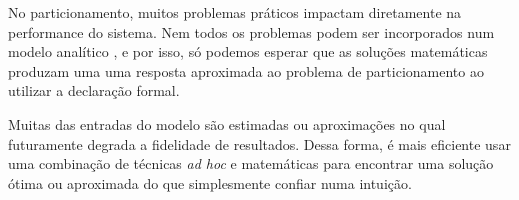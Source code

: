          No particionamento, muitos problemas práticos impactam diretamente na performance do sistema.
         Nem todos os problemas podem ser incorporados num modelo analítico \cite{Wang2016}, e por isso, só podemos esperar que as soluções matemáticas produzam uma uma resposta aproximada ao problema de particionamento ao utilizar a declaração formal.

         Muitas das entradas do modelo são estimadas ou aproximações no qual futuramente degrada a fidelidade de resultados.
         Dessa forma, é mais eficiente usar uma combinação de técnicas \textit{ad hoc} e matemáticas para encontrar uma solução ótima ou aproximada do que simplesmente confiar numa intuição.


